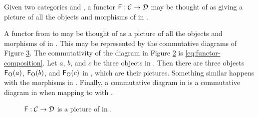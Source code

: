 \begin{remark}
  \label{re:functor-picture}

  Given two categories  and , a functor $\mathsf{F}: \mathcal{C} \to \mathcal{D}$ may be thought
  of as giving a picture of all the objects and morphisms of  in  \parencite[16]{maclane-1998}.

  A functor  from  to  may be thought of as a
  picture of all the objects and morphisms of  in . This
  may be represented by the commutative diagrams of Figure
  \ref{fig:functor}. The commutativity of the diagram in Figure
  \ref{fig:functor-b} is \eqref{eq:functor-composition}. Let $a$, $b$, and $c$
  be three objects in . Then there are three objects
  $\mathsf{F}_{\operatorname{O}}(a)$, $\mathsf{F}_{\operatorname{O}}(b)$, and $\mathsf{F}_{\operatorname{O}}(c)$ in , which
  are their pictures. Something similar happens with the morphisms in
  . Finally, a commutative diagram in  is a commutative
  diagram in  when mapping  to  with .
  \begin{figure}[htb]
    \begin{subfigure}[b]{0.5\linewidth}
      \begin{center}
      \end{center}
      \caption{}
      \label{fig:functor-a}
    \end{subfigure}
    \begin{subfigure}[b]{0.5\linewidth}
      \begin{center}
      \end{center}
      \caption{}
      \label{fig:functor-b}
    \end{subfigure}
    \caption{$\mathsf{F}: \mathcal{C} \to \mathcal{D}$ is a picture of  in .}
    \label{fig:functor}
  \end{figure}
\end{remark}

